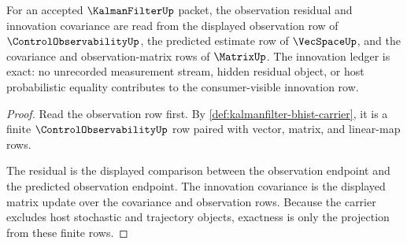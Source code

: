 \begin{theorem}
\label{thm:kalmanfilter-observation-innovation-ledger}
For an accepted $\KalmanFilterUp$ packet, the observation residual and innovation covariance are read from the displayed observation row of $\ControlObservabilityUp$, the predicted estimate row of $\VecSpaceUp$, and the covariance and observation-matrix rows of $\MatrixUp$. The innovation ledger is exact: no unrecorded measurement stream, hidden residual object, or host probabilistic equality contributes to the consumer-visible innovation row.
\end{theorem}
\begin{proof}
Read the observation row first. By \autoref{def:kalmanfilter-bhist-carrier}, it is a finite $\ControlObservabilityUp$ row paired with vector, matrix, and linear-map rows.

The residual is the displayed comparison between the observation endpoint and the predicted observation endpoint. The innovation covariance is the displayed matrix update over the covariance and observation rows. Because the carrier excludes host stochastic and trajectory objects, exactness is only the projection from these finite rows.
\end{proof}

